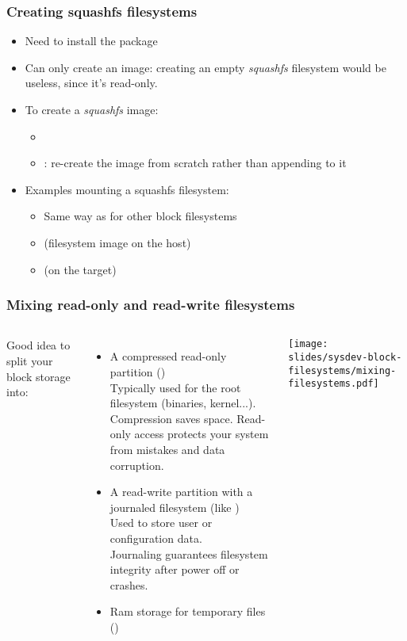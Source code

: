 \begin{frame}
  \frametitle{Creating squashfs filesystems}
  \begin{itemize}
  \item Need to install the  package
  \item Can only create an image: creating an empty {\em squashfs}
    filesystem would be useless, since it's read-only.
  \item To create a {\em squashfs} image:
    \begin{itemize}
    \item {}
    \item {}: re-create the image from scratch rather
      than appending to it
    \end{itemize}
  \item Examples mounting a squashfs filesystem:
    \begin{itemize}
    \item Same way as for other block filesystems
    \item {} (filesystem image on the host)
    \item {} (on the target)
    \end{itemize}
  \end{itemize}
\end{frame}

\begin{frame}
  \frametitle{Mixing read-only and read-write filesystems}
  \begin{columns}
    Good idea to split your block storage into:
    \begin{itemize}
    \item A compressed read-only partition ()\\
      Typically used for the root filesystem (binaries, kernel...).\\
      Compression saves space. Read-only access protects your system
      from mistakes and data corruption.
    \item A read-write partition with a journaled filesystem (like )\\
      Used to store user or configuration data.\\
      Journaling guarantees filesystem integrity after power off or crashes.
    \item Ram storage for temporary files ()
    \end{itemize}
    \texttt{[image: slides/sysdev-block-filesystems/mixing-filesystems.pdf]}
  \end{columns}
\end{frame}

